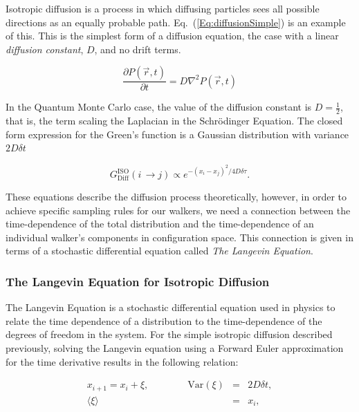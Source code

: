 Isotropic diffusion is a process in which diffusing particles sees all possible directions as an equally probable path. Eq.~(\ref{Eq:diffusionSimple}) is an example of this. This is the simplest form of a diffusion equation, the case with a linear \textit{diffusion constant}, $D$, and no drift terms.

\begin{equation}
 \label{Eq:diffusionSimple}
 \frac{\partial P(\vec r, t)}{\partial t} = D\nabla^2 P(\vec r, t) 
\end{equation}

In the Quantum Monte Carlo case, the value of the diffusion constant is $D=\frac{1}{2}$, that is, the term scaling the Laplacian in the Schrödinger Equation. The closed form expression for the Green's function is a Gaussian distribution with variance $2D\delta t$ \cite{abInitioMC}

\begin{equation}
\label{eq:GF_iso}
 G_{\mathrm{Diff}}^{\mathrm{ISO}}(i\,\rightarrow j) \propto e^{-(x_i-x_j)^2/4D\delta\tau}  .
\end{equation}

These equations describe the diffusion process theoretically, however, in order to achieve specific sampling rules for our walkers, we need a connection between the time-dependence of the total distribution and the time-dependence of an individual walker's components in configuration space. This connection is given in terms of a stochastic differential equation called \textit{The Langevin Equation}.

\subsubsection{The Langevin Equation for Isotropic Diffusion}

The Langevin Equation is a stochastic differential equation used in physics to relate the time dependence of a distribution to the time-dependence of the degrees of freedom in the system. For the simple isotropic diffusion described previously, solving the Langevin equation using a Forward Euler approximation for the time derivative results in the following relation:

\begin{eqnarray}
\label{eq:langevinSolSimple}
 x_{i+1} = x_i + \xi, \qquad\qquad \mathrm{Var}(\xi) &=& 2D\delta t, \\
			     \langle\xi\rangle &=& x_i, \nonumber 
\end{eqnarray}

